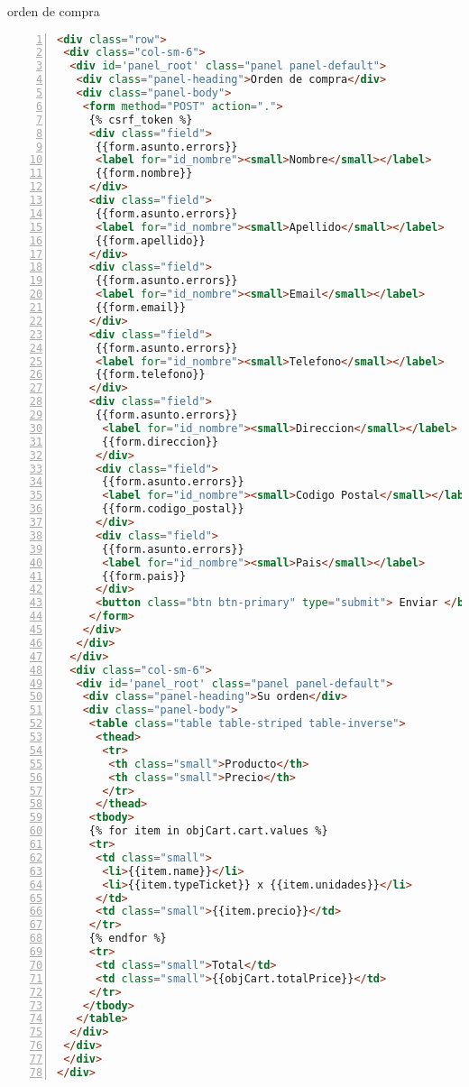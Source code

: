orden de compra
\begin{lstlisting}[framerule=0pt,
aboveskip=0.5cm,
framextopmargin=3pt,
framexbottommargin=3pt,
framexleftmargin=0.4cm,
framesep=0pt,
rulesep=.4pt,
numbers=left,
numbersep=15pt,
numberstyle=\tiny,
numberfirstline = false,
breaklines=true,
frame=single,
stringstyle=\ttfamily,
showstringspaces = false,
basicstyle=\small\ttfamily,
keywordstyle=\bfseries,
rulesepcolor=\color{black},
captionpos=b,
language=HTML,
caption=Pagina Orden Compra formato HTML.]
<div class="row">
 <div class="col-sm-6">
  <div id='panel_root' class="panel panel-default">
   <div class="panel-heading">Orden de compra</div>
   <div class="panel-body">
    <form method="POST" action=".">
     {% csrf_token %}
     <div class="field">
      {{form.asunto.errors}}
      <label for="id_nombre"><small>Nombre</small></label>
      {{form.nombre}}
     </div>
     <div class="field">
      {{form.asunto.errors}}
      <label for="id_nombre"><small>Apellido</small></label>
      {{form.apellido}}
     </div>
     <div class="field">
      {{form.asunto.errors}}
      <label for="id_nombre"><small>Email</small></label>
      {{form.email}}
     </div>
     <div class="field">
      {{form.asunto.errors}}
      <label for="id_nombre"><small>Telefono</small></label>
      {{form.telefono}}
     </div>
     <div class="field">
      {{form.asunto.errors}}
       <label for="id_nombre"><small>Direccion</small></label>
       {{form.direccion}}
      </div>
      <div class="field">
       {{form.asunto.errors}}
       <label for="id_nombre"><small>Codigo Postal</small></label>
       {{form.codigo_postal}}
      </div>
      <div class="field">
       {{form.asunto.errors}}
       <label for="id_nombre"><small>Pais</small></label>
       {{form.pais}}
      </div>
      <button class="btn btn-primary" type="submit"> Enviar </button>
     </form>
    </div>
   </div>
  </div>
  <div class="col-sm-6">
   <div id='panel_root' class="panel panel-default">
    <div class="panel-heading">Su orden</div>
    <div class="panel-body">
     <table class="table table-striped table-inverse">
      <thead>
       <tr>
        <th class="small">Producto</th>
        <th class="small">Precio</th>
       </tr>
      </thead>
     <tbody>
     {% for item in objCart.cart.values %}
     <tr>
      <td class="small">
       <li>{{item.name}}</li>
       <li>{{item.typeTicket}} x {{item.unidades}}</li>
      </td>
      <td class="small">{{item.precio}}</td>
     </tr>
     {% endfor %}
     <tr>
      <td class="small">Total</td>
      <td class="small">{{objCart.totalPrice}}</td>
     </tr>
    </tbody>
   </table>
  </div>
 </div>
 </div>
</div>
\end{lstlisting}
